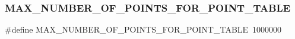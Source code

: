 \subsubsection{\texorpdfstring{M\+A\+X\+\_\+\+N\+U\+M\+B\+E\+R\+\_\+\+O\+F\+\_\+\+P\+O\+I\+N\+T\+S\+\_\+\+F\+O\+R\+\_\+\+P\+O\+I\+N\+T\+\_\+\+T\+A\+B\+LE}{MAX\_NUMBER\_OF\_POINTS\_FOR\_POINT\_TABLE}}
{\footnotesize\ttfamily \#define M\+A\+X\+\_\+\+N\+U\+M\+B\+E\+R\+\_\+\+O\+F\+\_\+\+P\+O\+I\+N\+T\+S\+\_\+\+F\+O\+R\+\_\+\+P\+O\+I\+N\+T\+\_\+\+T\+A\+B\+LE~1000000}

